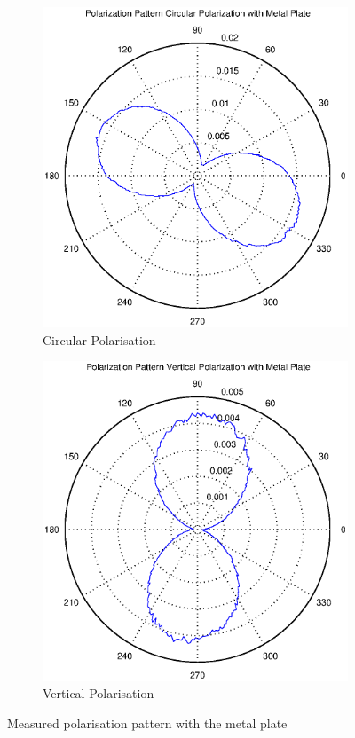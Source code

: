 \documentclass[11pt,a4paper]{article}
\begin{document}
\begin{figure}[H]
\begin{subfigure}{0.5\textwidth}
  \centering
  \includegraphics[width=1.2\linewidth]{2_4circ_pol_metal_plate.eps}
  \caption{Circular Polarisation}
  \label{fig:2_4circ}
\end{subfigure}%
\begin{subfigure}{0.5\textwidth}
  \centering
  \includegraphics[width=1.2\linewidth]{2_3vert_pol_metal_plate.eps}
  \caption{Vertical Polarisation}
  \label{fig:2_3vert}
\end{subfigure}
\caption{Measured polarisation pattern with the metal plate}
\label{fig:pol_pat_metal_plate}
\end{figure}
\end{document}
